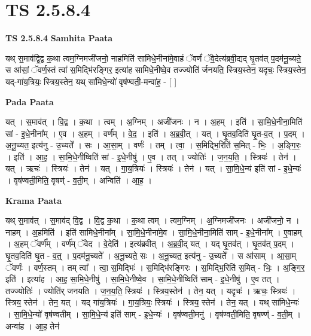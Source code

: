 \documentclass[17pt]{extarticle}
\begin{document}
\section*{ TS 2.5.8.4 }

\textbf{TS 2.5.8.4 } \newline
\textbf{Samhita Paata} \newline

यथ् स॒माव॑द्वि॒द्व क॒था त्वम॒ग्निमजी॑जनो॒ नाहमिति॑ सामिधे॒नीना॑मे॒वाहं ॅवर्णं॑ ॅवे॒देत्य॑ब्रवी॒द्यद् घृ॒तव॑त् प॒दम॑नू॒च्यते॒ स आ॑सां॒ ॅवर्ण॒स्तं त्वा॑ स॒मिद्भि॑रङ्गिर॒ इत्या॑ह सामिधे॒नीष्वे॒व तज्ज्योति॑ र्जनयति॒ स्त्रिय॒स्तेन॒ यदृचः॒ स्त्रिय॒स्तेन॒ यद्-गा॑य॒त्रियः॒ स्त्रिय॒स्तेन॒ यथ् सा॑मिधे॒न्यो॑ वृष॑ण्वती॒-मन्वा॑ह॒ - [  ] \newline

\textbf{Pada Paata} \newline

यत् । स॒माव॑त् । वि॒द्व । क॒था । त्वम् । अ॒ग्निम् । अजी॑जनः । न । अ॒हम् । इति॑ । सा॒मि॒धे॒नीना॒मिति॑ सां - इ॒धे॒नीना᳚म् । ए॒व । अ॒हम् । वर्ण᳚म् । वे॒द॒ । इति॑ । अ॒ब्र॒वी॒त् । यत् । घृ॒तव॒दिति॑ घृ॒त-व॒त् । प॒दम् । अ॒नू॒च्यत॒ इत्य॑नु - उ॒च्यते᳚ । सः । आ॒सा॒म् । वर्णः॑ । तम् । त्वा॒ । स॒मिद्भि॒रिति॑ स॒मित् - भिः॒ । अ॒ङ्गि॒रः॒ । इति॑ । आ॒ह॒ । सा॒मि॒धे॒नीष्विति॑ सां - इ॒धे॒नीषु॑ । ए॒व । तत् । ज्योतिः॑ । ज॒न॒य॒ति॒ । स्त्रियः॑ । तेन॑ । यत् । ऋचः॑ । स्त्रियः॑ । तेन॑ । यत् । गा॒य॒त्रियः॑ । स्त्रियः॑ । तेन॑ । यत् । सा॒मि॒धे॒न्य॑ इति॑ सां - इ॒धे॒न्यः॑ । वृष॑ण्वती॒मिति॒ वृषण्॑ - व॒ती॒म् । अन्विति॑ । आ॒ह॒ ।  \newline


\textbf{Krama Paata} \newline

यथ् स॒माव॑त् । स॒माव॑द् वि॒द्व । वि॒द्व क॒था । क॒था त्वम् । त्वम॒ग्निम् । अ॒ग्निमजी॑जनः । अजी॑जनो॒ न । नाहम् । अ॒हमिति॑ । इति॑ सामिधे॒नीना᳚म् । सा॒मि॒धे॒नीना॑मे॒व । सा॒मि॒धे॒नीना॒मिति॑ साम् - इ॒धे॒नीना᳚म् । ए॒वाहम् । अ॒हम् ॅवर्ण᳚म् । वर्ण॑म् ॅवेद । वे॒देति॑ । इत्य॑ब्रवीत् । अ॒ब्र॒वी॒द् यत् । यद् घृ॒तव॑त् । घृ॒तव॑त् प॒दम् । घृ॒तव॒दिति॑ घृ॒त - व॒त्॒ । प॒दम॑नू॒च्यते᳚ । अ॒नू॒च्यते॒ सः । अ॒नू॒च्यत॒ इत्य॑नु - उ॒च्यते᳚ । स आ॑साम् । आ॒सा॒म् ॅवर्णः॑ । वर्ण॒स्तम् । तम् त्वा᳚ । त्वा॒ स॒मिद्भिः॑ । स॒मिद्भि॑रङ्गिरः । स॒मिद्भि॒रिति॑ स॒मित् - भिः॒ । अ॒ङ्गि॒र॒ इति॑ । इत्या॑ह । आ॒ह॒ सा॒मि॒धे॒नीषु॑ । सा॒मि॒धे॒नीष्वे॒व । सा॒मि॒धे॒नीष्विति॑ साम् - इ॒धे॒नीषु॑ । ए॒व तत् । तज्ज्योतिः॑ । ज्योति॑र् जनयति । ज॒न॒य॒ति॒ स्त्रियः॑ । स्त्रिय॒स्तेन॑ । तेन॒ यत् । यदृचः॑ । ऋचः॒ स्त्रियः॑ । स्त्रिय॒ स्तेन॑ । तेन॒ यत् । यद् गा॑य॒त्रियः॑ । गा॒य॒त्रियः॒ स्त्रियः॑ । स्त्रिय॒ स्तेन॑ । तेन॒ यत् । यथ् सा॑मिधे॒न्यः॑ । सा॒मि॒धे॒न्यो॑ वृष॑ण्वतीम् । सा॒मि॒धे॒न्य॑ इति॑ साम् - इ॒धे॒न्यः॑ । वृष॑ण्वती॒मनु॑ । वृष॑ण्वती॒मिति॒ वृषण्ण्॑ - व॒ती॒म् । अन्वा॑ह । आ॒ह॒ तेन॑ \newline
\end{document}
